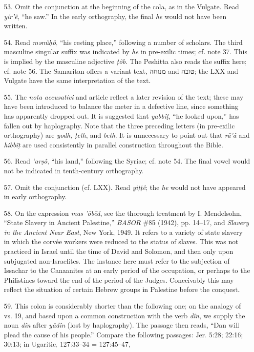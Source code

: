 \begin{enumerate}
53. Omit the conjunction at the beginning of the cola, as in the Vulgate.
Read \emph{yir'ê}, ``he saw.'' In the early orthography, the final \emph{he}
would not have been written.

54. Read \emph{mənûḥô}, ``his resting place,'' following a number of scholars.
The third masculine singular suffix was indicated by \emph{he} in pre-exilic
times; cf. note 37. This is implied by the masculine adjective \emph{ṭôb}. The
Peshitta also reads the suffix here; cf. note 56. The Samaritan offers a
variant text, מנוחה and טובה; the LXX and Vulgate have the same interpretation
of the text.

55. The \emph{nota accusativi} and article reflect a later revision of the
text; these may have been introduced to balance the meter in a defective line,
since something has apparently dropped out. It is suggested that
\emph{yabbîṭ}, ``he looked upon,'' has fallen out by haplography. Note that the
three preceding letters (in pre-exilic orthography) are \emph{yodh, ṭeth}, and
\emph{beth}. It is unnecessary to point out that \emph{rā'â} and \emph{hibbîṭ}
are used consistently in parallel construction throughout the Bible.

56. Read \emph{'arṣô}, ``his land,'' following the Syriac; cf. note 54. The
final vowel would not be indicated in tenth-century orthography.

57. Omit the conjunction (cf. LXX). Read \emph{yiṭṭê}; the \emph{he} would not
have appeared in early orthography.

58. On the expression \emph{mas 'ōbēd}, see the thorough treatment by
I. Mendelsohn, ``State Slavery in Ancient Palestine,'' \emph{BASOR} \#85
(1942), pp. 14--17, and \emph{Slavery in the Ancient Near East}, New York,
1949. It refers to a variety of state slavery in which the corvée workers were
reduced to the status of slaves. This was not practiced in Israel until the
time of David and Solomon, and then only upon subjugated non-Israelites. The
instance here must refer to the subjection of Issachar to the Canaanites at an
early period of the occupation, or perhaps to the Philistines toward the end of
the period of the Judges. Conceivably this may reflect the situation of certain
Hebrew groups in Palestine before the conquest.

59. This colon is considerably shorter than the following one; on the analogy
of vs. 19, and based upon a common construction with the verb \emph{dîn}, we
supply the noun \emph{dîn} after \emph{yādîn} (lost by haplography). The
passage then reads, ``Dan will plead the cause of his people.'' Compare the
following passages: Jer. 5:28; 22:16; 30:13; in Ugaritic, 127:33--34 =
127:45--47,


\end{enumerate}
